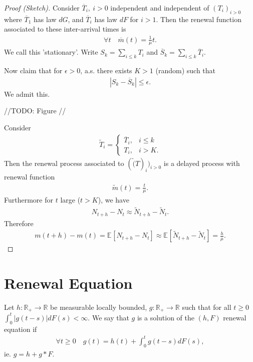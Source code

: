 \begin{proof}[Proof (Sketch)]
	Consider $\overline{T}_i,\ i> 0$ independent and independent of $(T_i)_{i> 0}$ where $\overline{T}_1$ has law $dG$, and $\overline{T}_{i}$ has law $dF$ for $i> 1$.
	Then the renewal function associated to these inter-arrival times is
	\begin{align}
		\forall t \quad \overline{m}(t) = \frac{1}{\mu }t.
	\end{align}
We call this 'stationary'. Write $S_k = \sum_{i\leq k}^{} T_i$ and $\overline{S}_k = \sum_{i \leq k}^{} \overline{T}_i$.

Now claim that for $\epsilon > 0$, a.s. there exists $K>1$ (random) such that
\begin{align}
|S_k - \overline{S}_k | \leq \epsilon.
\end{align}
We admit this.

{\color{blue} //TODO: Figure //}

Consider 
\begin{align}
	\tilde{T}_i =
	\begin{cases}
		\overline{T}_i, & i \leq k \\
		T_i, & i>K.
	\end{cases}
\end{align}
Then the renewal process associated to $(\tilde(T)_i)_{i>0}$ is a delayed process with renewal function
\begin{align}
	\tilde{m}(t) = \frac{t}{\mu }.
\end{align}
Furthermore for $t$ large ($t>K$), we have
\begin{align}
	N_{t+h} - N_t \approx \tilde{N}_{t+h} - \tilde{N}_{t}.
\end{align}
Therefore
\begin{align}
	m(t+h) - m(t) = \mathbb{E}_{} \left[ N_{t+h} - N_t \right] \approx \mathbb{E}_{} \left[ \tilde{N}_{t+h} - \tilde{N}_{t} \right] = \frac{h}{\mu }.
\end{align}
\end{proof}

\section{Renewal Equation}

\begin{defn}
	Let $h:\mathbb{R}_+ \to \mathbb{R}$ be measurable locally bounded, $g:\mathbb{R}_+ \to \mathbb{R}$ such that for all $t\geq 0$ $\int_{0}^{t} |g(t-s)|dF(s) <\infty$. We say that $g$ is a solution of the $(h,F)$ renewal equation if
\begin{align}
	\boxed{ \forall t\geq 0 \quad g(t) = h(t) + \int_{0}^{t} g(t-s)dF(s) ,}
\end{align}
ie. $g=h+g*F$.
\end{defn}

